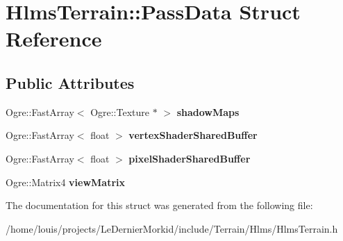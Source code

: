 \hypertarget{struct_hlms_terrain_1_1_pass_data}{}\section{Hlms\+Terrain\+:\+:Pass\+Data Struct Reference}
\label{struct_hlms_terrain_1_1_pass_data}
\subsection*{Public Attributes}
\begin{DoxyCompactItemize}
\item 
\mbox{\label{struct_hlms_terrain_1_1_pass_data_ac1e7191cdffc43b7a8adf70203a28f19}} 
Ogre\+::\+Fast\+Array$<$ Ogre\+::\+Texture $\ast$ $>$ {\bfseries shadow\+Maps}
\item 
\mbox{\label{struct_hlms_terrain_1_1_pass_data_a27dbe70984eb2d8085dd247bd04b0b98}} 
Ogre\+::\+Fast\+Array$<$ float $>$ {\bfseries vertex\+Shader\+Shared\+Buffer}
\item 
\mbox{\label{struct_hlms_terrain_1_1_pass_data_adfd3b35c0c10cbfe52dca4fb6a216515}} 
Ogre\+::\+Fast\+Array$<$ float $>$ {\bfseries pixel\+Shader\+Shared\+Buffer}
\item 
\mbox{\label{struct_hlms_terrain_1_1_pass_data_a698f2e686954dbc8a427cbde28a0d7f1}} 
Ogre\+::\+Matrix4 {\bfseries view\+Matrix}
\end{DoxyCompactItemize}


The documentation for this struct was generated from the following file\+:\begin{DoxyCompactItemize}
\item 
/home/louis/projects/\+Le\+Dernier\+Morkid/include/\+Terrain/\+Hlms/Hlms\+Terrain.\+h\end{DoxyCompactItemize}
